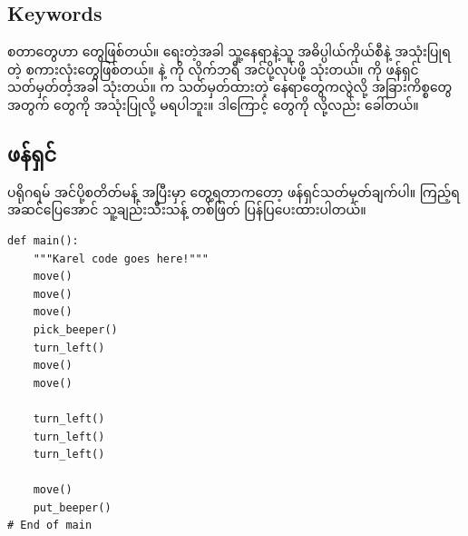 \subsection*{Keywords}
\fEn{,} \fEn{,}  \fEn{,}  စတာတွေဟာ  တွေဖြစ်တယ်။  ရေးတဲ့အခါ သူ့နေရာနဲ့သူ အဓိပ္ပါယ်ကိုယ်စီနဲ့ အသုံးပြုရတဲ့ စကားလုံးတွေဖြစ်တယ်။  နဲ့  ကို လိုက်ဘရီ အင်ပို့လုပ်ဖို့ သုံးတယ်။  ကို ဖန်ရှင် သတ်မှတ်တဲ့အခါ သုံးတယ်။  က သတ်မှတ်ထားတဲ့ နေရာတွေကလွဲလို့ အခြားကိစ္စတွေအတွက်  တွေကို အသုံးပြုလို့ မရပါဘူး။ ဒါကြောင့်   တွေကို  လို့လည်း ခေါ်တယ်။ 

\subsection*{ ဖန်ရှင်}
 ပရိုဂရမ် အင်ပို့စတိတ်မန့် အပြီးမှာ တွေ့ရတာကတော့  ဖန်ရှင်သတ်မှတ်ချက်ပါ။ ကြည့်ရအဆင်ပြေအောင် သူ့ချည်းသီးသန့် တစ်ဖြတ် ပြန်ပြပေးထားပါတယ်။
%
\setlength{\fboxsep}{0pt}
\begin{verbatim}
def main():
    """Karel code goes here!"""
    move()
    move()
    move()
    pick_beeper()
    turn_left()
    move()
    move()

    turn_left()
    turn_left()
    turn_left()

    move()
    put_beeper()
# End of main
\end{verbatim}

